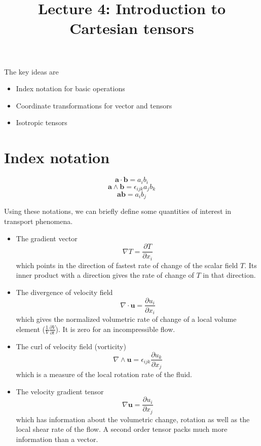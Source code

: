 \documentclass[11pt, letterpaper]{article}
\title{Lecture 4: Introduction to Cartesian tensors}
\newcommand{\e}{\epsilon}
\newcommand{\1}{\bm{1}}
\newcommand{\pd}[2]{\frac{\partial #1}{\partial #2}}
\begin{document}
\maketitle

The key ideas are
\begin{itemize}
  \item Index notation for basic operations 
  \item Coordinate transformations for vector and tensors
  \item Isotropic tensors
\end{itemize}

\section{Index notation}
$$\bm{a}\cdot\bm{b}=a_ib_i$$
$$\bm{a}\wedge\bm{b}=\e_{ijk} a_j b_k$$
$$\bm{a}\bm{b}=a_ib_j$$

Using these notations, we can briefly define some quantities of interest in transport phenomena.\\
\begin{itemize}
\item The gradient vector
$$\nabla T = \pd{T}{x_i}$$
which points in the direction of fastest rate of change of the scalar field $T$. Its inner product with a direction gives the rate of change of $T$ in that direction.

\item The divergence of velocity field
$$\nabla \cdot \bm{u} = \pd{u_i}{x_i}$$
which gives the normalized volumetric rate of change of a local volume element ($\frac{1}{V}\pd{V}{t}$). It is zero for an incompressible flow.

\item The curl of velocity field (vorticity)
$$\nabla \wedge \bm{u} = \e_{ijk}\pd{u_k}{x_j} $$
which is a measure of the local rotation rate of the fluid.

\item The velocity gradient tensor
$$\nabla \bm{u} = \pd{u_i}{x_j}$$
which has information about the volumetric change, rotation as well as the local shear rate of the flow. A second order tensor packs much more information than a vector. 
\end{itemize}
\end{document}
